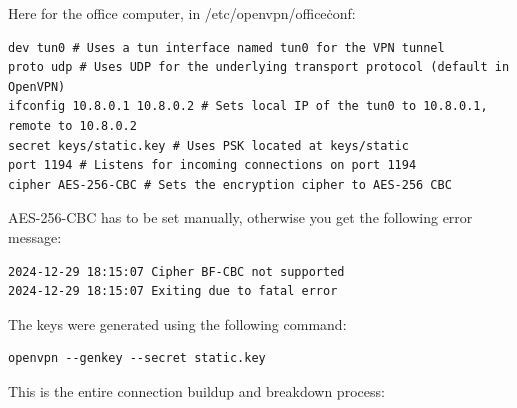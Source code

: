 Here for the office computer, in /etc/openvpn/office\.conf:

\begin{verbatim}
dev tun0 # Uses a tun interface named tun0 for the VPN tunnel
proto udp # Uses UDP for the underlying transport protocol (default in OpenVPN)
ifconfig 10.8.0.1 10.8.0.2 # Sets local IP of the tun0 to 10.8.0.1, remote to 10.8.0.2
secret keys/static.key # Uses PSK located at keys/static
port 1194 # Listens for incoming connections on port 1194
cipher AES-256-CBC # Sets the encryption cipher to AES-256 CBC
\end{verbatim}
AES-256-CBC has to be set manually, otherwise you get the following error message:

\begin{verbatim}
2024-12-29 18:15:07 Cipher BF-CBC not supported
2024-12-29 18:15:07 Exiting due to fatal error
\end{verbatim}


The keys were generated using the following command:

\begin{verbatim}
openvpn --genkey --secret static.key
\end{verbatim}

This is the entire connection buildup and breakdown process:


